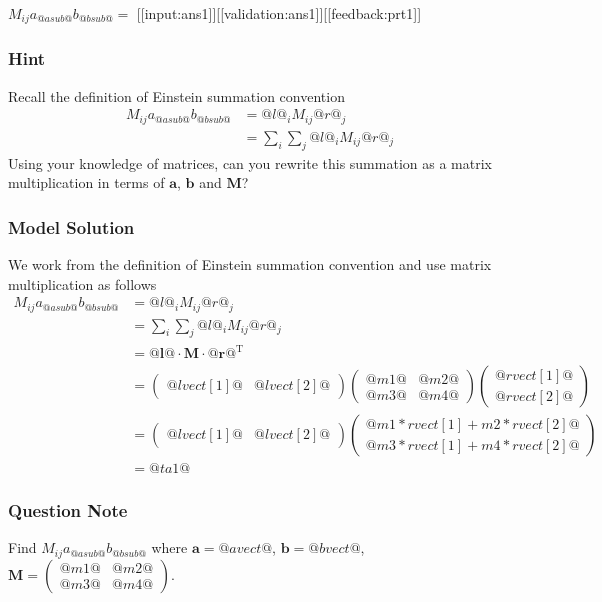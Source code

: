 \documentclass[a4paper,10pt]{article}
\begin{document}
\(M_{ij}a_{@asub@}b_{@bsub@} = \) [[input:ans1]][[validation:ans1]][[feedback:prt1]]
\subsubsection{Hint}
Recall the definition of Einstein summation convention \begin{align*} M_{ij}a_{@asub@}b_{@bsub@} &= @l@_i M_{ij} @r@_j \\ &=\sum_{i}\sum_{j} @l@_i M_{ij} @r@_j \end{align*} Using your knowledge of matrices, can you rewrite this summation as a matrix multiplication in terms of \(\textbf{a}\), \(\textbf{b}\) and \(\textbf{M}\)?
\subsubsection{Model Solution}
We work from the definition of Einstein summation convention and use matrix multiplication as follows \begin{align*} M_{ij}a_{@asub@}b_{@bsub@} &= @l@_i M_{ij} @r@_j \\ &=\sum_{i}\sum_{j} @l@_i M_{ij} @r@_j \\ &= \textbf{@l@} \cdot \textbf{M} \cdot \textbf{@r@}^{\text{T}} \\ &= \left(\begin{matrix} @lvect[1]@ & @lvect[2]@ \end{matrix}\right) \left(\begin{matrix} @m1@ & @m2@ \\ @m3@ & @m4@ \end{matrix}\right) \left(\begin{matrix} @rvect[1]@ \\ @rvect[2]@ \end{matrix}\right) \\ &= \left(\begin{matrix} @lvect[1]@ & @lvect[2]@ \end{matrix}\right) \left(\begin{matrix} @m1*rvect[1]+m2*rvect[2]@ \\ @m3*rvect[1]+m4*rvect[2]@ \end{matrix}\right) \\ &= @ta1@ \end{align*}
\subsubsection{Question Note}
Find \(M_{ij}a_{@asub@}b_{@bsub@}\) where \(\textbf{a} = @avect@\), \(\textbf{b} = @bvect@\), \(\textbf{M} = \left( \begin{matrix} @m1@ & @m2@ \\ @m3@ & @m4@ \end{matrix} \right)\).
\end{document}
